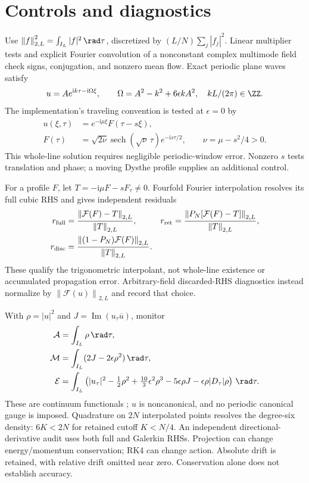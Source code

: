 \documentclass[11pt]{article}
\newcommand{\ii}{\mathrm{i}}
\newcommand{\normtwo}[1]{\left\lVert #1\right\rVert_{2,L}}
\newcommand{\opD}{\lvert D_\tau\rvert}
\begin{document}
\section{Controls and diagnostics}
Use $\normtwo{f}^2=\int_{I_L}|f|^2\,\rad\tau$, discretized by
$(L/N)\sum_j|f_j|^2$. Linear multiplier tests and explicit Fourier
convolution of a nonconstant complex multimode field check signs,
conjugation, and nonzero mean flow. Exact periodic plane waves satisfy
\begin{equation}\label{eq:plane}
 u=Ae^{\ii k\tau-\ii\Omega\xi},\qquad
 \Omega=A^2-k^2+6\epsilon kA^2,\quad kL/(2\pi)\in\ZZ.
\end{equation}
The implementation's traveling convention is tested at $\epsilon=0$ by
\begin{equation}\label{eq:nls}
\begin{aligned}
 u(\xi,\tau)&=e^{-\ii\mu\xi}F(\tau-s\xi),\\
 F(\tau)&=\sqrt{2\nu}\operatorname{sech}(\sqrt\nu\,\tau)e^{-\ii s\tau/2},
 \qquad \nu=\mu-s^2/4>0.
\end{aligned}
\end{equation}
This whole-line solution requires negligible periodic-window error.
Nonzero $s$ tests translation and phase; a moving Dysthe profile supplies
an additional control.

For a profile $F$, let $T=-\ii\mu F-sF_\tau\ne0$. Fourfold Fourier
interpolation resolves its full cubic RHS and gives independent residuals
\begin{equation}\label{eq:residual}
\begin{aligned}
 r_{\rm full}&=\frac{\normtwo{\mathcal F(F)-T}}{\normtwo{T}},&
 r_{\rm ret}&=\frac{\normtwo{P_N[\mathcal F(F)-T]}}{\normtwo{T}},\\
 r_{\rm disc}&=\frac{\normtwo{(1-P_N)\mathcal F(F)}}{\normtwo{T}}.
\end{aligned}
\end{equation}
These qualify the trigonometric interpolant, not whole-line existence or
accumulated propagation error. Arbitrary-field discarded-RHS diagnostics
instead normalize by $\normtwo{\mathcal F(u)}$ and record that choice.

With $\rho=|u|^2$ and $J=\operatorname{Im}(u_\tau\overline u)$, monitor
\begin{align}
 \mathcal A&=\int_{I_L}\rho\,\rad\tau,\label{eq:action}\\
 \mathcal M&=\int_{I_L}(2J-2\epsilon\rho^2)\,\rad\tau,\label{eq:momentum}\\
 \mathcal E&=\int_{I_L}\left(|u_\tau|^2-\tfrac12\rho^2
 +\tfrac{10}{3}\epsilon^2\rho^3-5\epsilon\rho J
 -\epsilon\rho\opD\rho\right)\,\rad\tau.\label{eq:energy}
\end{align}
These are continuum functionals \cite{fedele2012}; $u$ is noncanonical,
and no periodic canonical gauge is imposed. Quadrature on $2N$ interpolated
points resolves the degree-six density: $6K<2N$ for retained cutoff
$K<N/4$. An independent directional-derivative audit uses both full and
Galerkin RHSs. Projection can change energy/momentum conservation; RK4
can change action. Absolute drift is retained, with relative drift omitted
near zero. Conservation alone does not establish accuracy.
\end{document}
